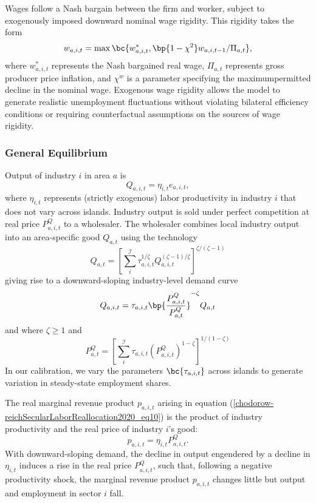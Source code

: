 \documentclass[12pt]{article}
\theoremstyle{definition}
\begin{document}
Wages follow a Nash bargain between the firm and worker, subject to exogenously imposed downward nominal wage rigidity. This rigidity takes the form
\begin{equation}
    \label{chodorow-reichSecularLaborReallocation2020_eq14}
    w_{a, i, t} = \max\bc{w_{a,i,t}^{*}, \bp{1 - \chi^2} w_{a, i, t-1} / \Pi_{a, t}},
\end{equation}
where $w_{a,i,t}^{*}$ represents the Nash bargained real wage, $\Pi_{a, t}$ represents gross producer price inflation, and $\chi^w$ is a parameter specifying the maximumpermitted decline in the nominal wage. Exogenous wage rigidity allows the model to generate realistic unemployment fluctuations without violating bilateral efficiency conditions or requiring counterfactual assumptions on the sources of wage rigidity.

\subsubsection{General Equilibrium}

Output of industry $i$ in area $a$ is 
\begin{equation}
    \label{chodorow-reichSecularLaborReallocation2020_eq15}
    Q_{a, i, t} = \eta_{i, t} e_{a, i, t}, 
\end{equation}
where $\eta_{i, t}$ represents (strictly exogenous) labor productivity in industry $i$ that does not vary across islands. Industry output is sold under perfect competition at real price $P^{Q}_{a,i,t}$ to a wholesaler. The wholesaler combines local industry output into an area-specific good $Q_{a,t}$ using the technology 
\begin{equation}
    \label{chodorow-reichSecularLaborReallocation2020_eq16}
    Q_{a, t}=\left[\sum_i^{\mathcal{I}} \tau_{a, i, t}^{1 / \zeta} Q_{a, i, t}^{(\zeta-1) / \zeta}\right]^{\zeta /(\zeta-1)}
\end{equation}
giving rise to a downward-sloping industry-level demand curve 
$$
Q_{a,i,t} = \tau_{a,i,t} \bp{\frac{P_{a,i,t}^{Q}}{P_{a,t}^{Q}}}^{-\zeta} Q_{a,t}
$$
and where $\zeta \geq 1$ and 
$$
P_{a, t}^Q=\left[\sum_i^{\mathcal{I}} \tau_{a, i, t}\left(P_{a, i, t}^Q\right)^{1-\zeta}\right]^{1 /(1-\zeta)}
$$
In  our calibration, we vary the parameters $\bc{\tau_{a, i, t}}$ across islands to generate variation in steady-state employment shares.

The real marginal revenue product $p_{a,i,t}$ arising in equation (\ref{chodorow-reichSecularLaborReallocation2020_eq10}) is the product of industry productivity and the real price of industry $i$'s good:
\begin{equation}
    \label{chodorow-reichSecularLaborReallocation2020_eq17}
    p_{a, i, t} = \eta_{i, t} P_{a, i, t}^{Q}.
\end{equation}
With downward-sloping demand, the decline in output engendered by a decline in $\eta_{i, t}$ induces a rise in the real price $P_{a, i, t}^{Q}$, such that, following a negative productivity shock, the marginal revenue product $p_{a, i, t}$ changes little but output and employment in sector $i$ fall.
\end{document}
